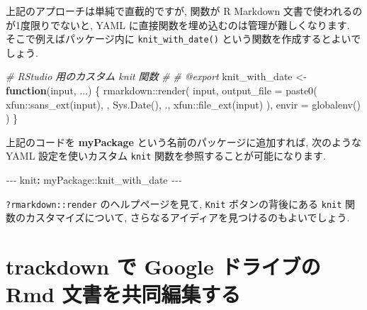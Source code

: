 \documentclass[
  11pt,
  lualatex,ja=standard,jafont=noto]{bxjsreport}
\newenvironment{Shaded}{\begin{snugshade}}{\end{snugshade}}
\newcommand{\AttributeTok}[1]{\textcolor[rgb]{0.77,0.63,0.00}{#1}}
\newcommand{\CommentTok}[1]{\textcolor[rgb]{0.56,0.35,0.01}{\textit{#1}}}
\newcommand{\ControlFlowTok}[1]{\textcolor[rgb]{0.13,0.29,0.53}{\textbf{#1}}}
\newcommand{\FunctionTok}[1]{\textcolor[rgb]{0.00,0.00,0.00}{#1}}
\newcommand{\KeywordTok}[1]{\textcolor[rgb]{0.13,0.29,0.53}{\textbf{#1}}}
\newcommand{\NormalTok}[1]{#1}
\newcommand{\OtherTok}[1]{\textcolor[rgb]{0.56,0.35,0.01}{#1}}
\newcommand{\PreprocessorTok}[1]{\textcolor[rgb]{0.56,0.35,0.01}{\textit{#1}}}
\newcommand{\SpecialCharTok}[1]{\textcolor[rgb]{0.00,0.00,0.00}{#1}}
\newcommand{\StringTok}[1]{\textcolor[rgb]{0.31,0.60,0.02}{#1}}
\begin{document}
上記のアプローチは単純で直截的ですが, 関数が R Markdown 文書で使われるのが1度限りでないと, YAML に直接関数を埋め込むのは管理が難しくなります. そこで例えばパッケージ内に \texttt{knit\_with\_date()} という関数を作成するとよいでしょう.

\begin{Shaded}
\begin{Highlighting}[numbers=left,,]
\CommentTok{\#\textquotesingle{} RStudio 用のカスタム knit 関数}
\CommentTok{\#\textquotesingle{}}
\CommentTok{\#\textquotesingle{} @export}
\NormalTok{knit\_with\_date }\OtherTok{\textless{}{-}} \ControlFlowTok{function}\NormalTok{(input, ...) \{}
\NormalTok{  rmarkdown}\SpecialCharTok{::}\FunctionTok{render}\NormalTok{(}
\NormalTok{    input,}
    \AttributeTok{output\_file =} \FunctionTok{paste0}\NormalTok{(}
\NormalTok{        xfun}\SpecialCharTok{::}\FunctionTok{sans\_ext}\NormalTok{(input), }\StringTok{\textquotesingle{}{-}\textquotesingle{}}\NormalTok{, }\FunctionTok{Sys.Date}\NormalTok{(), }\StringTok{\textquotesingle{}.\textquotesingle{}}\NormalTok{,}
\NormalTok{        xfun}\SpecialCharTok{::}\FunctionTok{file\_ext}\NormalTok{(input)}
\NormalTok{    ),}
    \AttributeTok{envir =} \FunctionTok{globalenv}\NormalTok{()}
\NormalTok{  )}
\NormalTok{\}}
\end{Highlighting}
\end{Shaded}

上記のコードを \textbf{myPackage} という名前のパッケージに追加すれば, 次のような YAML 設定を使いカスタム \texttt{knit} 関数を参照することが可能になります.

\begin{Shaded}
\begin{Highlighting}[]
\PreprocessorTok{{-}{-}{-}}
\FunctionTok{knit}\KeywordTok{:}\AttributeTok{ myPackage::knit\_with\_date}
\PreprocessorTok{{-}{-}{-}}
\end{Highlighting}
\end{Shaded}

\texttt{?rmarkdown::render} のヘルプページを見て, \texttt{Knit} ボタンの背後にある \texttt{knit} 関数のカスタマイズについて, さらなるアイディアを見つけるのもよいでしょう.

\hypertarget{google-drive}{%
\section{trackdown で Google ドライブの Rmd 文書を共同編集する}\label{google-drive}}
\end{document}
